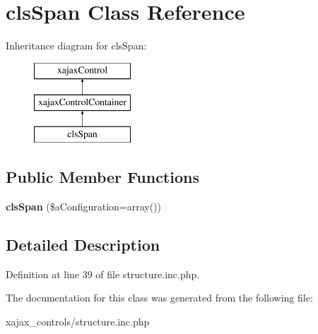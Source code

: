 \hypertarget{classclsSpan}{
\section{clsSpan Class Reference}
\label{classclsSpan}
}
Inheritance diagram for clsSpan:\begin{figure}[H]
\begin{center}
\leavevmode
\includegraphics[height=3.000000cm]{classclsSpan}
\end{center}
\end{figure}
\subsection*{Public Member Functions}
\begin{DoxyCompactItemize}
\item 
\hypertarget{classclsSpan_a9ad80f5a546312191830033c04ab67db}{
{\bfseries clsSpan} (\$aConfiguration=array())}
\label{classclsSpan_a9ad80f5a546312191830033c04ab67db}

\end{DoxyCompactItemize}


\subsection{Detailed Description}


Definition at line 39 of file structure.inc.php.



The documentation for this class was generated from the following file:\begin{DoxyCompactItemize}
\item 
xajax\_\-controls/structure.inc.php\end{DoxyCompactItemize}

